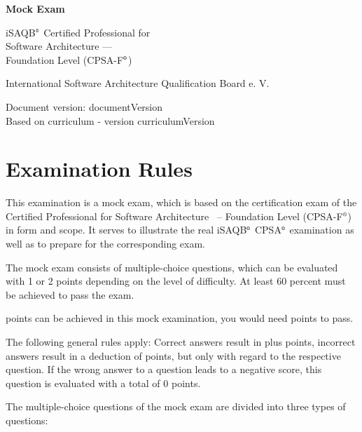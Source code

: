 \documentclass[12pt,a4paper]{article}
\newcounter{examQuestionCount}
\newcounter{examTotalPoints}
\newcounter{examMinPoints}
\newcounter{examQuestion}\setcounter{examQuestion}{1}
\newcommand{\registered}{$^\textrm{\tiny\textregistered}$}
\begin{document}
\begin{titlepage}
  \begin{center}
   {\huge\bfseries Mock Exam

     iSAQB\registered{} Certified Professional for\\ Software Architecture ---\\[2ex]
     
     Foundation Level (CPSA-F\registered{})}

  \bigskip
  
  {\large International Software Architecture Qualification Board
    e. V.}

  \bigskip

  Document version: {{documentVersion}}\\
  Based on curriculum - version {{curriculumVersion}}
\end{center}

\vspace*{\fill}

\end{titlepage}

\section*{Examination Rules}

This examination is a mock exam, which is based on the certification
exam of the Certified Professional for Software Architecture ~--
Foundation Level (CPSA-F\registered{}) in form and scope. It serves to illustrate
the real iSAQB\registered{} CPSA\registered{} examination as well as to prepare for the
corresponding exam.

The mock exam consists of \theexamQuestionCount{} multiple-choice
questions, which can be evaluated with 1 or 2 points depending on the
level of difficulty. At least 60 percent must be achieved to pass the
exam.

\theexamTotalPoints{} points can be achieved in this mock examination,
you would need \theexamMinPoints{} points to pass.

The following general rules apply: Correct answers result in plus
points, incorrect answers result in a deduction of points, but only
with regard to the respective question. If the wrong answer to a
question leads to a negative score, this question is evaluated with a
total of 0 points.

The multiple-choice questions of the mock exam are divided into three
types of questions:
\end{document}

